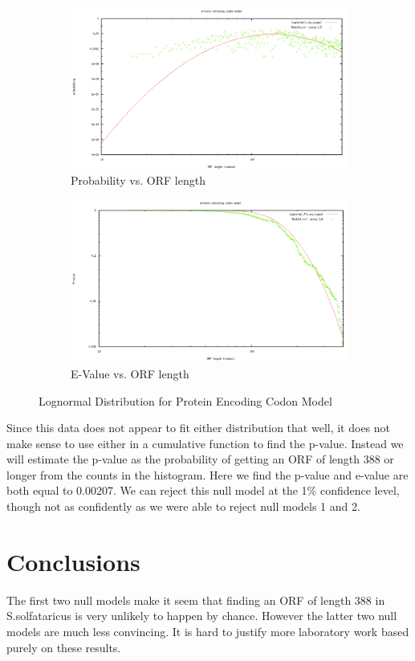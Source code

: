 \documentclass[11pt]{article}
\begin{document}
\begin{figure}[!htb]
        \centering
        \begin{subfigure}[b]{0.49\textwidth}
                \centering
		\includegraphics[width=\textwidth]{Model4LogProb.pdf} 
		\caption{Probability vs. ORF length}
        \end{subfigure}
        \begin{subfigure}[b]{0.49\textwidth}
                \centering
		\includegraphics[width=\textwidth]{Model4LogE.pdf} 
		\caption{E-Value vs. ORF length}
        \end{subfigure}

        \caption{Lognormal Distribution for Protein Encoding Codon Model}\label{fig:Model4Log} 
\end{figure}

Since this data does not appear to fit either distribution that well, it does not make sense to use either in a cumulative function to find the p-value.  Instead we will estimate the p-value as the probability of getting an ORF of length 388 or longer from the counts in the histogram.  Here we find the p-value and e-value are both equal to 0.00207.  We can reject this null model at the 1\% confidence level, though not as confidently as we were able to reject null models 1 and 2.

\section{Conclusions}

The first two null models make it seem that finding an ORF of length 388 in S.solfataricus is very unlikely to happen by chance.  However the latter two null models are much less convincing.  It is hard to justify more laboratory work based purely on these results.
\end{document}
